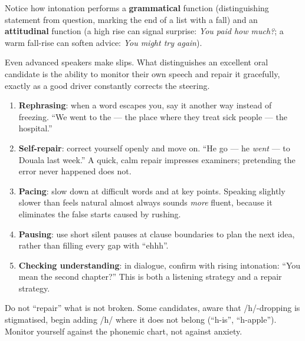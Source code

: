 \documentclass[11pt]{article}
\newcommand{\cle}[1]{{\popxbold\color{popdark}#1}}
\newcounter{popsec}
\newcounter{popsub}
\newcommand{\courssub}[1]{%
  \stepcounter{popsub}%
  \par\vspace{9pt}\noindent{\popxbold\fontsize{11.5}{13}\selectfont\color{popink}{\color{poporange}\thepopsec.\thepopsub}\hspace{6pt}#1}\par\nopagebreak\vspace{4pt}
}
\begin{document}
Notice how intonation performs a \textbf{grammatical} function (distinguishing statement from question, marking the end of a list with a fall) and an \textbf{attitudinal} function (a high rise can signal surprise: \emph{You paid \nearrow how much?}; a warm fall-rise can soften advice: \emph{You might \searrow\nearrow try again}).

\courssub{Self-Monitoring in Speech}

Even advanced speakers make slips. What distinguishes an excellent oral candidate is the ability to \cle{monitor} their own speech and repair it gracefully, exactly as a good driver constantly corrects the steering.

\begin{methode}
\begin{enumerate}
\item \textbf{Rephrasing}: when a word escapes you, say it another way instead of freezing. ``We went to the --- the place where they treat sick people --- the hospital.''
\item \textbf{Self-repair}: correct yourself openly and move on. ``He go --- he \emph{went} --- to Douala last week.'' A quick, calm repair impresses examiners; pretending the error never happened does not.
\item \textbf{Pacing}: slow down at difficult words and at key points. Speaking slightly slower than feels natural almost always sounds \emph{more} fluent, because it eliminates the false starts caused by rushing.
\item \textbf{Pausing}: use short silent pauses at clause boundaries to plan the next idea, rather than filling every gap with ``ehhh''.
\item \textbf{Checking understanding}: in dialogue, confirm with rising intonation: ``You mean the second chapter?'' This is both a listening strategy and a repair strategy.
\end{enumerate}
\end{methode}

\begin{attention}
Do not ``repair'' what is not broken. Some candidates, aware that /h/-dropping is stigmatised, begin adding /h/ where it does not belong (``h-is'', ``h-apple''). Monitor yourself against the phonemic chart, not against anxiety.
\end{attention}
\end{document}
